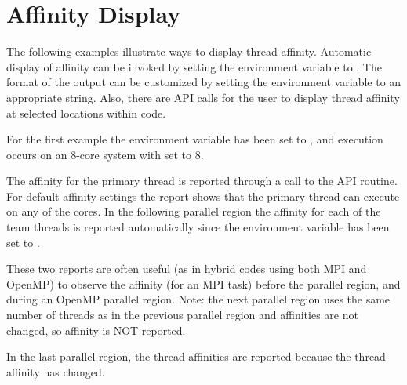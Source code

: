 \section{Affinity Display}
\label{sec:affinity_display}

The following examples illustrate ways to display thread affinity.
Automatic display of affinity can be invoked by setting
the  environment variable to .  
The format of the output can be customized by setting the 
 environment variable to an appropriate string.  
Also, there are API calls for the user to display thread affinity 
at selected locations within code.

For the first example the environment variable  has been
set to , and execution occurs on an 8-core system with  set to 8.

The affinity for the primary thread is reported through a call to the API
 routine. For default affinity settings
the report shows that the primary thread can execute on any of the cores. 
In the following parallel region the affinity for each of the team threads is reported
automatically since the  environment variable has been set
to .

These two reports are often useful (as in hybrid codes using both MPI and OpenMP) 
to observe the affinity (for an MPI task) before the parallel region,
and during an OpenMP parallel region. Note: the next parallel region uses the 
same number of threads as in the previous parallel region and affinities are 
not changed, so affinity is NOT reported.

In the last parallel region, the thread affinities are reported
because the thread affinity has changed.


